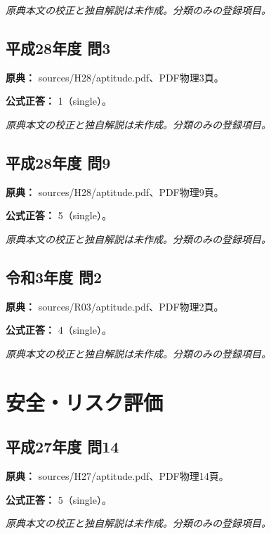 \par\textit{原典本文の校正と独自解説は未作成。分類のみの登録項目。}

\subsection{平成28年度 問3}
\label{q:h28-reg-apt-03}

\noindent\textbf{原典：} sources/H28/aptitude.pdf、PDF物理3頁。

\textbf{公式正答：} 1（single）。

\par\textit{原典本文の校正と独自解説は未作成。分類のみの登録項目。}

\subsection{平成28年度 問9}
\label{q:h28-reg-apt-09}

\noindent\textbf{原典：} sources/H28/aptitude.pdf、PDF物理9頁。

\textbf{公式正答：} 5（single）。

\par\textit{原典本文の校正と独自解説は未作成。分類のみの登録項目。}

\subsection{令和3年度 問2}
\label{q:r03-reg-apt-02}

\noindent\textbf{原典：} sources/R03/aptitude.pdf、PDF物理2頁。

\textbf{公式正答：} 4（single）。

\par\textit{原典本文の校正と独自解説は未作成。分類のみの登録項目。}

\section{安全・リスク評価}

\subsection{平成27年度 問14}
\label{q:h27-reg-apt-14}

\noindent\textbf{原典：} sources/H27/aptitude.pdf、PDF物理14頁。

\textbf{公式正答：} 5（single）。

\par\textit{原典本文の校正と独自解説は未作成。分類のみの登録項目。}

